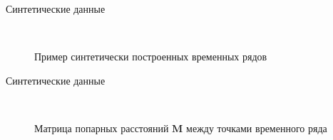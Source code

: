 \documentclass{beamer}
\begin{document}
\begin{frame}{Синтетические данные}
	\begin{figure}[h!t]\center
		\\
		\caption{Пример синтетически построенных временных рядов}
	\end{figure}
\end{frame}
\begin{frame}{Синтетические данные}
	\begin{figure}[h!t]\center
		\\
		\caption{Матрица попарных расстояний $\textbf{M}$ между точками временного ряда}
	\end{figure}
\end{frame}
\end{document}
